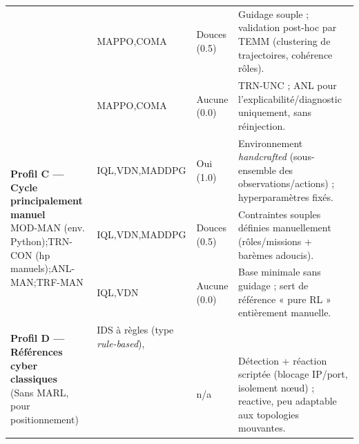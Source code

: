 \begin{table}[h!]
\begin{tabularx}{\textwidth}{p{3.8cm}p{3.2cm}p{2.8cm}p{4.5cm}}
                                      & MAPPO,\;COMA                                     & Douces (0.5)                       & Guidage souple ; validation post-hoc par TEMM (clustering de trajectoires, cohérence rôles).                                                                           \\
                                      & MAPPO,\;COMA                                     & Aucune (0.0)                       & TRN-UNC ; ANL pour l’explicabilité/diagnostic uniquement, sans réinjection.                                                                                            \\
    \midrule
    \multirow{3}{*}{\parbox{3.8cm}{\textbf{Profil C — Cycle principalement manuel}                                                                                                                                                                                                                     \\MOD-MAN (env. Python);\;TRN-CON (hp manuels);\;ANL-MAN;\;TRF-MAN}}
                                      & IQL,\;VDN,\;MADDPG                               & Oui (1.0)                          & Environnement \textit{handcrafted} (sous-ensemble des observations/actions) ; hyperparamètres fixés.                                                                   \\
                                      & IQL,\;VDN,\;MADDPG                               & Douces (0.5)                       & Contraintes souples définies manuellement (rôles/missions + barèmes adoucis).                                                                                          \\
                                      & IQL,\;VDN                                        & Aucune (0.0)                       & Base minimale sans guidage ; sert de référence « pure RL » entièrement manuelle.                                                                                       \\
    \midrule
    \multirow{2}{*}{\parbox{3.8cm}{\textbf{Profil D — Références cyber classiques}                                                                                                                                                                                                                     \\(Sans MARL, pour positionnement)}}
                                      & IDS à règles (type \textit{rule-based}),                                                                                                                                                                                                                       \\ML sup.~(SVM/KNN) &  & n/a & Détection + réaction scriptée (blocage IP/port, isolement nœud) ; reactive, peu adaptable aux topologies mouvantes. \\

\end{tabularx}
\end{table}
